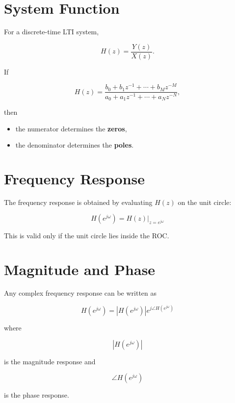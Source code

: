 
\section{System Function}

For a discrete-time LTI system,

\[
H(z)=\frac{Y(z)}{X(z)}.
\]

If

\[
H(z)=
\frac{b_0+b_1z^{-1}+\cdots+b_Mz^{-M}}
{a_0+a_1z^{-1}+\cdots+a_Nz^{-N}},
\]

then

\begin{itemize}
\item the numerator determines the \textbf{zeros},
\item the denominator determines the \textbf{poles}.
\end{itemize}


\section{Frequency Response}

The frequency response is obtained by evaluating \(H(z)\) on the unit circle:

\[
\boxed{
H(e^{j\omega})=
H(z)\Big|_{z=e^{j\omega}}
}
\]

This is valid only if the unit circle lies inside the ROC.


\section{Magnitude and Phase}

Any complex frequency response can be written as

\[
\boxed{
H(e^{j\omega})=
|H(e^{j\omega})|e^{j\angle H(e^{j\omega})}
}
\]

where

\[
|H(e^{j\omega})|
\]

is the magnitude response and

\[
\angle H(e^{j\omega})
\]

is the phase response.



